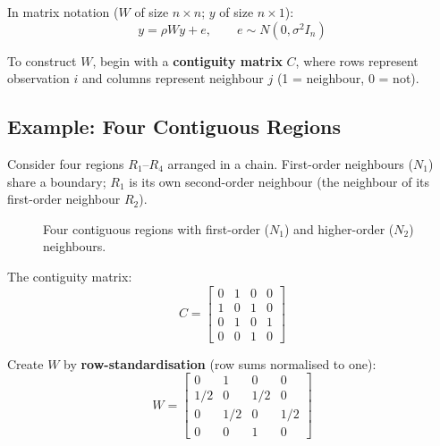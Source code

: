 In matrix notation ($W$ of size $n\times n$; $y$ of size $n\times 1$):
\begin{equation}
  y = \rho Wy + e, \qquad e \sim N(0, \sigma^2 I_n)
\end{equation}

To construct $W$, begin with a \textbf{contiguity matrix}
$C$, where rows represent observation $i$ and
columns represent neighbour $j$ (1 = neighbour, 0 = not).

\subsection{Example: Four Contiguous Regions}

Consider four regions $R_1$--$R_4$ arranged in a chain. First-order
neighbours ($N_1$) share a boundary; $R_1$ is its own second-order
neighbour (the neighbour of its first-order neighbour $R_2$).

\begin{figure}[htp]
\centering
{}
\caption{Four contiguous regions with first-order ($N_1$) and
higher-order ($N_2$) neighbours.}
\label{fig_ContiguousRegions}
\end{figure}

The contiguity matrix:
\begin{equation}
  C = \begin{bmatrix}
    0 & 1 & 0 & 0 \\
    1 & 0 & 1 & 0 \\
    0 & 1 & 0 & 1 \\
    0 & 0 & 1 & 0
  \end{bmatrix}
\end{equation}

Create $W$ by \textbf{row-standardisation} (row sums normalised to one):
\begin{equation}
  W = \begin{bmatrix}
    0   & 1   & 0   & 0   \\
    1/2 & 0   & 1/2 & 0   \\
    0   & 1/2 & 0   & 1/2 \\
    0   & 0   & 1   & 0
  \end{bmatrix}
\end{equation}

